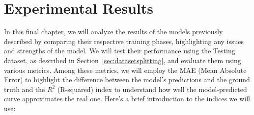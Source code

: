 \chapter{Experimental Results}
In this final chapter, we will analyze the results of the
models previously described by comparing their respective
training phases, highlighting any issues and strengths of the model.
We will test their performance using the Testing dataset,
as described in Section~\ref{sec:datasetsplitting}, and
evaluate them using various metrics.
Among these metrics, we will employ the MAE (Mean Absolute Error)\cite{metrics}
to highlight the difference between the model's predictions and
the ground truth and the $R^2$ (R-squared)\cite{metrics} index to understand how well
the model-predicted curve approximates the real one.
Here's a brief introduction to the indices we will use:


